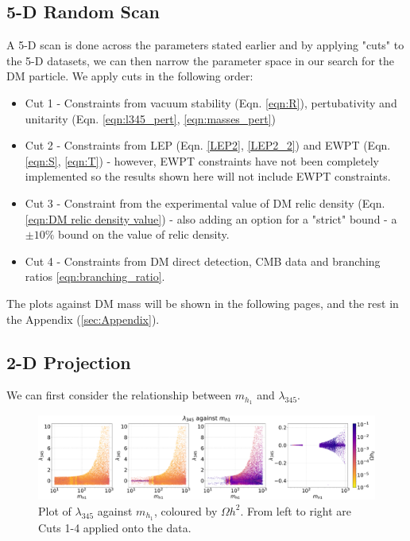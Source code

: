 \documentclass[12pt]{article}
\begin{document}
\subsection{5-D Random Scan}
\label{5-D scan}
A 5-D scan is done across the parameters stated earlier and by applying "cuts" to the 5-D datasets, we can then narrow the parameter space in our search for the DM particle.
We apply cuts in the following order:
\begin{itemize}
    \item Cut 1 - Constraints from vacuum stability (Eqn. \ref{eqn:R}), pertubativity and unitarity (Eqn. \ref{eqn:l345_pert}, \ref{eqn:masses_pert}) 
    \item Cut 2 - Constraints from LEP (Eqn. \ref{LEP2}, \ref{LEP2_2}) and EWPT (Eqn. \ref{eqn:S}, \ref{eqn:T}) - however, EWPT constraints have not been completely implemented so the results shown here will not include EWPT constraints.
    \item Cut 3 - Constraint from the experimental value of DM relic density (Eqn. \ref{eqn:DM relic density value}) - also adding an option for a "strict" bound - a $\pm 10 \%$ bound on the value of relic density.
    \item Cut 4 - Constraints from DM direct detection, CMB data and branching ratios \ref{eqn:branching_ratio}.
\end{itemize}

The plots against DM mass will be shown in the following pages, and the rest in the Appendix (\ref{sec:Appendix}).

\subsection{2-D Projection}
\label{sec:2D-proj}
We can first consider the relationship between $m_{h_1}$ and $\lambda_{345}$. 
\begin{figure}[ht]
    \centering
    \includegraphics[width=\linewidth]{4plot/l345_MD1.pdf}
    \caption{Plot of $\lambda_{345}$ against $m_{h_1}$, coloured by $\Omega h^2$. From left to right are Cuts 1-4 applied onto the data.}
    \label{fig:l345_md1_main}
\end{figure}
\end{document}
